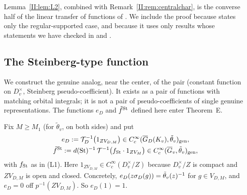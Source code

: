 \begin{remark}
Lemma~\ref{II:lem:L2}, combined with Remark~\ref{II:rem:centralchar}, is the converse half of the linear transfer of functions of \cite{DKV84}. We include the proof because \cite[\S4.6]{Bad08} states only the regular-supported case, and because it uses only results whose statements we have checked in \cite{FK86} and \cite{Bad08}.
\end{remark}


\subsection{The Steinberg-type function}\label{II:subsec:steinberg}
We construct the genuine analog, near the center, of the pair (constant function on $D_v^\times$, Steinberg pseudo-coefficient). It exists as a pair of functions with matching orbital integrals; it is not a pair of pseudo-coefficients of single genuine representations. The functions $e_D$ and $\tilde f^{\mathrm{St}}$ defined here enter Theorem~E.

Fix $M\ge M_1$ (for $\tilde\theta_v$, on both sides) and put
\begin{gather*} e_D:=\mathcal T_D^{-1}\big(1_{ZV_{D,M}}\big)\in C_c^\infty(\overline{G}_D(K_v),\tilde\theta_v)_{\mathrm{gen}},\\ \tilde f^{\mathrm{St}}:=d(\mathrm{St})^{-1}\,\mathcal T^{-1}\big(f_{\mathrm{St}}\cdot1_{ZV_M}\big)\in C_c^\infty(\overline{G}_v,\tilde\theta_v)_{\mathrm{gen}}, \end{gather*}
with $f_{\mathrm{St}}$ as in (L1). Here $1_{ZV_{D,M}}\in C_c^\infty(D_v^\times/Z)$ because $D_v^\times/Z$ is compact and $ZV_{D,M}$ is open and closed. Concretely, $e_D(z\sigma_D(g))=\tilde\theta_v(z)^{-1}$ for $g\in V_{D,M}$, and $e_D=0$ off $p^{-1}(ZV_{D,M})$. So $e_D(1)=1$.

